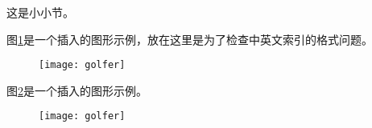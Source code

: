 



这是小小节。

图\ref{Figure:Introduction:Example1}是一个插入的图形示例，放在这里是为了检查中英文索引的格式问题。
\begin{figure}
\centering
\texttt{[image: golfer]}
\label{Figure:Introduction:Example1}
\end{figure}

图\ref{Figure:Introduction:Example2}是一个插入的图形示例。
\begin{figure}
\centering
\texttt{[image: golfer]}
\label{Figure:Introduction:Example2}
\end{figure}
